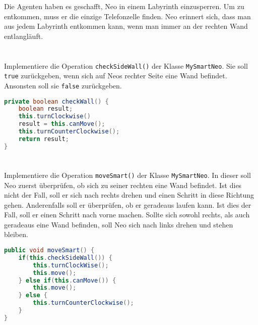 \begin{questions}


    Die Agenten haben es geschafft, Neo in einem Labyrinth einzusperren.
    Um zu entkommen, muss er die einzige Telefonzelle finden.
    Neo erinnert sich, dass man aus jedem Labyrinth entkommen kann, wenn man immer an der rechten Wand entlangläuft.

    \begin{parts}
        \part{} Implementiere die Operation \lstinline{checkSideWall()} der Klasse \lstinline{MySmartNeo}.
        Sie soll \lstinline{true} zurückgeben, wenn sich auf Neos rechter Seite eine Wand befindet.
        Ansonsten soll sie \lstinline{false} zurückgeben.

        \begin{solution}
        \begin{lstlisting}[language=Java]
private boolean checkWall() {
    boolean result;
    this.turnClockwise()
    result = this.canMove();
    this.turnCounterClockwise();
    return result;
}
        \end{lstlisting}
        \end{solution}

        \part{} Implementiere die Operation \lstinline{moveSmart()} der Klasse \lstinline{MySmartNeo}.
        In dieser soll Neo zuerst überprüfen, ob sich zu seiner rechten eine Wand befindet.
        Ist dies nicht der Fall, soll er sich nach rechts drehen und einen Schritt in diese Richtung gehen.
        Anderenfalls soll er überprüfen, ob er geradeaus laufen kann. Ist dies der Fall, soll er einen Schritt nach vorne machen.
        Sollte sich sowohl rechts, als auch geradeaus eine Wand befinden, soll Neo sich nach links drehen und stehen bleiben.

        \begin{solution}
        \begin{lstlisting}[language=Java]
public void moveSmart() {
    if(this.checkSideWall()) {
        this.turnClockWise();
        this.move();
    } else if(this.canMove()) {
        this.move();
    } else {
        this.turnCounterClockwise();
    }
}
        \end{lstlisting}
        \end{solution}


\end{parts}
\end{questions}
